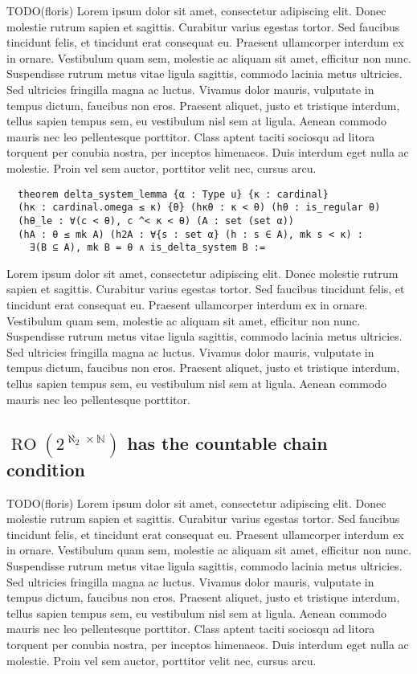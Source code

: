 \documentclass[a4paper,USenglish,cleveref, autoref]{lipics-v2019}
\theoremstyle{definition}
\begin{document}
TODO(floris)
Lorem ipsum dolor sit amet, consectetur adipiscing elit. Donec molestie rutrum sapien et sagittis. Curabitur varius egestas tortor. Sed faucibus tincidunt felis, et tincidunt erat consequat eu. Praesent ullamcorper interdum ex in ornare. Vestibulum quam sem, molestie ac aliquam sit amet, efficitur non nunc. Suspendisse rutrum metus vitae ligula sagittis, commodo lacinia metus ultricies. Sed ultricies fringilla magna ac luctus. Vivamus dolor mauris, vulputate in tempus dictum, faucibus non eros. Praesent aliquet, justo et tristique interdum, tellus sapien tempus sem, eu vestibulum nisl sem at ligula. Aenean commodo mauris nec leo pellentesque porttitor. Class aptent taciti sociosqu ad litora torquent per conubia nostra, per inceptos himenaeos. Duis interdum eget nulla ac molestie. Proin vel sem auctor, porttitor velit nec, cursus arcu.

\begin{lstlisting}
  theorem delta_system_lemma {α : Type u} {κ : cardinal}
  (hκ : cardinal.omega ≤ κ) {θ} (hκθ : κ < θ) (hθ : is_regular θ)
  (hθ_le : ∀(c < θ), c ^< κ < θ) (A : set (set α))
  (hA : θ ≤ mk A) (h2A : ∀{s : set α} (h : s ∈ A), mk s < κ) :
    ∃(B ⊆ A), mk B = θ ∧ is_delta_system B :=
  \end{lstlisting}

  Lorem ipsum dolor sit amet, consectetur adipiscing elit. Donec molestie rutrum sapien et sagittis. Curabitur varius egestas tortor. Sed faucibus tincidunt felis, et tincidunt erat consequat eu. Praesent ullamcorper interdum ex in ornare. Vestibulum quam sem, molestie ac aliquam sit amet, efficitur non nunc. Suspendisse rutrum metus vitae ligula sagittis, commodo lacinia metus ultricies. Sed ultricies fringilla magna ac luctus. Vivamus dolor mauris, vulputate in tempus dictum, faucibus non eros. Praesent aliquet, justo et tristique interdum, tellus sapien tempus sem, eu vestibulum nisl sem at ligula. Aenean commodo mauris nec leo pellentesque porttitor.

\subsection{$\operatorname{RO}(2^{\aleph_2 \times \mathbb{N}})$ has the countable chain condition}
TODO(floris)
Lorem ipsum dolor sit amet, consectetur adipiscing elit. Donec molestie rutrum sapien et sagittis. Curabitur varius egestas tortor. Sed faucibus tincidunt felis, et tincidunt erat consequat eu. Praesent ullamcorper interdum ex in ornare. Vestibulum quam sem, molestie ac aliquam sit amet, efficitur non nunc. Suspendisse rutrum metus vitae ligula sagittis, commodo lacinia metus ultricies. Sed ultricies fringilla magna ac luctus. Vivamus dolor mauris, vulputate in tempus dictum, faucibus non eros. Praesent aliquet, justo et tristique interdum, tellus sapien tempus sem, eu vestibulum nisl sem at ligula. Aenean commodo mauris nec leo pellentesque porttitor. Class aptent taciti sociosqu ad litora torquent per conubia nostra, per inceptos himenaeos. Duis interdum eget nulla ac molestie. Proin vel sem auctor, porttitor velit nec, cursus arcu.
\end{document}
